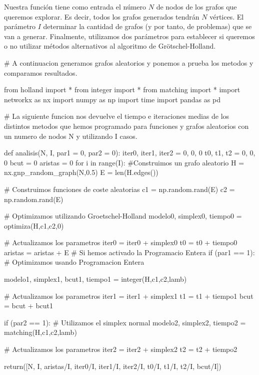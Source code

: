 \documentclass[twoside,a4paper,openright,12pt,tikz]{book}
\begin{document}
Nuestra función tiene como entrada el número $N$ de nodos de los grafos que queremos explorar. Es decir, todos los grafos generados tendrán $N$ vértices. El parámetro $I$ determinar la cantidad de grafos (y por tanto, de problemas) que se van a generar. Finalmente, utilizamos dos parámetros para establecer si queremos o no utilizar métodos alternativos al algoritmo de Grötschel-Holland. 
\begin{pythone}
# A continuacion generamos grafos aleatorios y ponemos a prueba los metodos y comparamos resultados.

from holland import *
from integer import *
from matching import *
import networkx as nx
import numpy as np
import time
import pandas as pd

# La siguiente funcion nos devuelve el tiempo e iteraciones medias de los distintos metodos que hemos programado para funciones y grafos aleatorios con un numero de nodos N y utilizando I casos.

def analisis(N, I, par1 = 0, par2 = 0):
    iter0, iter1, iter2 = 0, 0, 0
    t0, t1, t2 = 0, 0, 0
    bcut = 0
    aristas = 0
    for i in range(I):
        #Construimos un grafo aleatorio
        H = nx.gnp_random_graph(N,0.5)
        E = len(H.edges())
        
        # Construimos funciones de coste aleatorias
        c1 = np.random.rand(E)
        c2 = np.random.rand(E)
        
        # Optimizamos utilizando Groetschel-Holland
        modelo0, simplex0, tiempo0 = optimiza(H,c1,c2,0)
        
        # Actualizamos los parametros
        iter0 = iter0 + simplex0
        t0 = t0 + tiempo0
        aristas = aristas + E
        # Si hemos activado la Programacio Entera
        if (par1 == 1):
            # Optimizamos usando Programacion Entera

            modelo1, simplex1, bcut1, tiempo1 = integer(H,c1,c2,lamb)

            # Actualizamos los parametros
            iter1 = iter1 + simplex1
            t1 = t1 + tiempo1
            bcut = bcut + bcut1
        
        if (par2 == 1):
            # Utilizamos el simplex normal
            modelo2, simplex2, tiempo2 = matching(H,c1,c2,lamb)
            
            # Actualizamos los parametros
            iter2 = iter2 + simplex2
            t2 = t2 + tiempo2
        
    return([N, I, aristas/I, iter0/I,  iter1/I, iter2/I,  
            t0/I, t1/I, t2/I, bcut/I])
      
\end{pythone}
\newpage 
\end{document}
